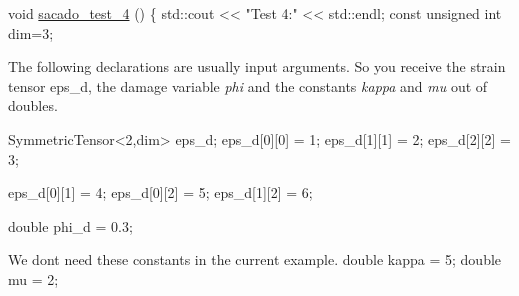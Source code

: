 \begin{DoxyCode}
\textcolor{keywordtype}{void} \hyperlink{Sacado__example_8cc_a2f4def4563e31d720e07bc7d6363ebe2}{sacado\_test\_4} ()
\{
    std::cout << \textcolor{stringliteral}{"Test 4:"} << std::endl;
    \textcolor{keyword}{const} \textcolor{keywordtype}{unsigned} \textcolor{keywordtype}{int} dim=3;
\end{DoxyCode}
 The following declarations are usually input arguments. So you receive the strain tensor  eps\+\_\+d, the damage variable {\itshape phi} and the constants {\itshape kappa} and {\itshape mu} out of doubles. 
\begin{DoxyCode}
SymmetricTensor<2,dim> eps\_d;
eps\_d[0][0] = 1;
eps\_d[1][1] = 2;
eps\_d[2][2] = 3;

eps\_d[0][1] = 4;
eps\_d[0][2] = 5;
eps\_d[1][2] = 6;

\textcolor{keywordtype}{double} phi\_d = 0.3;
\end{DoxyCode}
 We don\textquotesingle{}t need these constants in the current example. double kappa = 5; double mu = 2;

